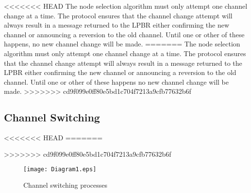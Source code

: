 <<<<<<< HEAD
The node selection algorithm must only attempt one channel change at a time. The protocol ensures that the channel change attempt will always result in a message returned to the LPBR either confirming the new channel or announcing a reversion to the old channel. Until one or other of these happens, no new channel change will be made.
=======
The node selection algorithm must only attempt one channel change at a time. The protocol ensures that the channel change attempt will always result in a message returned to the LPBR either confirming the new channel or announcing a reversion to the old channel. Until one or other of these happens no new channel change will be made.
>>>>>>> cd9f099e0ff80e5bd1c704f7213a9cfb77632b6f





\subsection{Channel Switching}
\label{sec:channelswitch}

<<<<<<< HEAD
=======


>>>>>>> cd9f099e0ff80e5bd1c704f7213a9cfb77632b6f
\begin{figure}
\centering
\texttt{[image: Diagram1.eps]}
\caption{Channel switching processes}
\label{fig_sim}
\end{figure}

